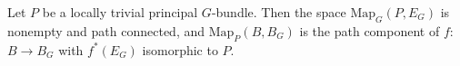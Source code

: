 Let $P$ be a locally trivial principal $G$-bundle. Then the space $\text{Map}_G(P, E_G)$ is nonempty and path connected, and $\text{Map}_P(B, B_G)$ is the path component of $f$: $B \rightarrow B_G$ with $f^*(E_G)$ isomorphic to $P$.
